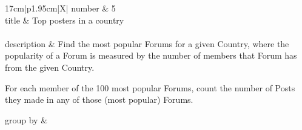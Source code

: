 \renewcommand*{\arraystretch}{1.1}

\noindent\begin{tabularx}{17cm}{|p{1.95cm}|X|}
	\hline
	number      & 5                                                          \\ \hline
%
	title       & Top posters in a country                                                           \\ \hline
	 \\ \hline
	description & Find the most popular Forums for a given Country, where the popularity
of a Forum is measured by the number of members that Forum has from the
given Country.

For each member of the 100 most popular Forums, count the number of
Posts they made in any of those (most popular) Forums.
 \\ \hline
	
%
	group by       &
	 \\ \hline
	

\end{tabularx}
